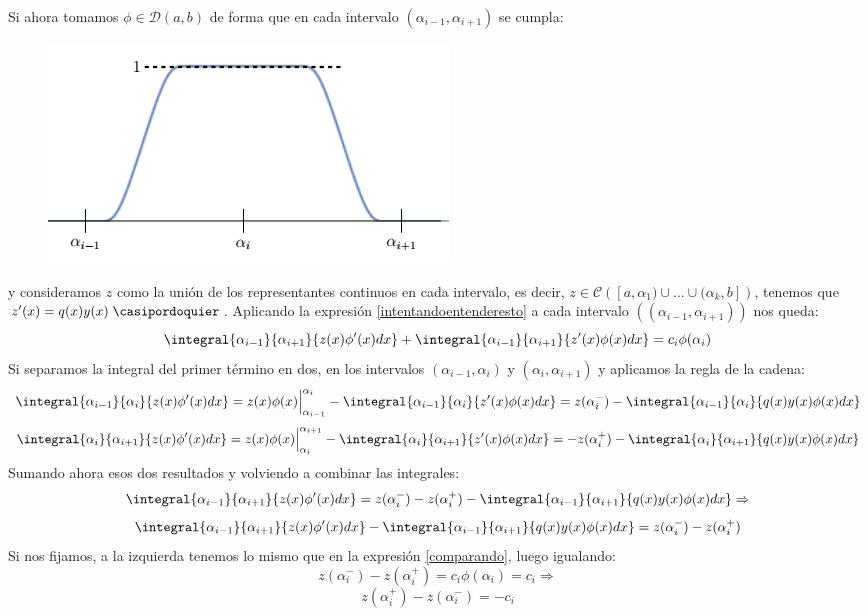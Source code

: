 \begin{itemize}
Si ahora tomamos $\phi\in\mathcal{D}(a,b)$ de forma que en cada intervalo $(\alpha_{i-1},\alpha_{i+1})$ se cumpla:
\begin{figure}[H]
   \center
  \includegraphics[scale=0.6]{img/flatproof.png}
\end{figure}
y consideramos $z$ como la unión de los representantes continuos en cada intervalo, es decir,
$z\in\mathcal{C}\left([a,\alpha_1)\cup...\cup(\alpha_k,b]\right)$, tenemos que $z'(x)=q(x)y(x) \; \casipordoquier$. Aplicando la expresión \eqref{intentandoentenderesto} a cada intervalo $((\alpha_{i-1},\alpha_{i+1}))$ nos queda:
\begin{equation}
\label{comparando}
\integral{\alpha_{i-1}}{\alpha_{i+1}}{z(x)\phi'(x)dx}+\integral{\alpha_{i-1}}{\alpha_{i+1}}{z'(x)\phi(x)dx}=c_i\phi(\alpha_i)
\end{equation}
Si separamos la integral del primer término en dos, en los intervalos $(\alpha_{i-1},\alpha_{i})$ y $(\alpha_{i},\alpha_{i+1})$ y aplicamos la regla de la cadena:
\[
\integral{\alpha_{i-1}}{\alpha_{i}}{z(x)\phi'(x)dx}=z(x)\phi(x)\Big|_{\alpha_{i-1}}^{\alpha_{i}}-\integral{\alpha_{i-1}}{\alpha_{i}}{z'(x)\phi(x)dx}=z(\alpha_{i}^-)-\integral{\alpha_{i-1}}{\alpha_{i}}{q(x)y(x)\phi(x)dx}
\]
\[
\integral{\alpha_{i}}{\alpha_{i+1}}{z(x)\phi'(x)dx}=z(x)\phi(x)\Big|_{\alpha_{i}}^{\alpha_{i+1}}-\integral{\alpha_{i}}{\alpha_{i+1}}{z'(x)\phi(x)dx}=-z(\alpha_{i}^+)-\integral{\alpha_{i}}{\alpha_{i+1}}{q(x)y(x)\phi(x)dx}
\]
Sumando ahora esos dos resultados y volviendo a combinar las integrales:
\[
\integral{\alpha_{i-1}}{\alpha_{i+1}}{z(x)\phi'(x)dx}=z(\alpha_{i}^-)-z(\alpha_{i}^+)-\integral{\alpha_{i-1}}{\alpha_{i+1}}{q(x)y(x)\phi(x)dx} \Rightarrow
\]
\[
\integral{\alpha_{i-1}}{\alpha_{i+1}}{z(x)\phi'(x)dx}-\integral{\alpha_{i-1}}{\alpha_{i+1}}{q(x)y(x)\phi(x)dx}=z(\alpha_{i}^-)-z(\alpha_{i}^+)
\]
Si nos fijamos, a la izquierda tenemos lo mismo que en la expresión \eqref{comparando}, luego igualando:
\[
z(\alpha_{i}^-)-z(\alpha_{i}^+)=c_i\phi(\alpha_i)=c_i \Rightarrow
\]
\[
z(\alpha_{i}^+)-z(\alpha_{i}^-)=-c_i
\]
\end{itemize}